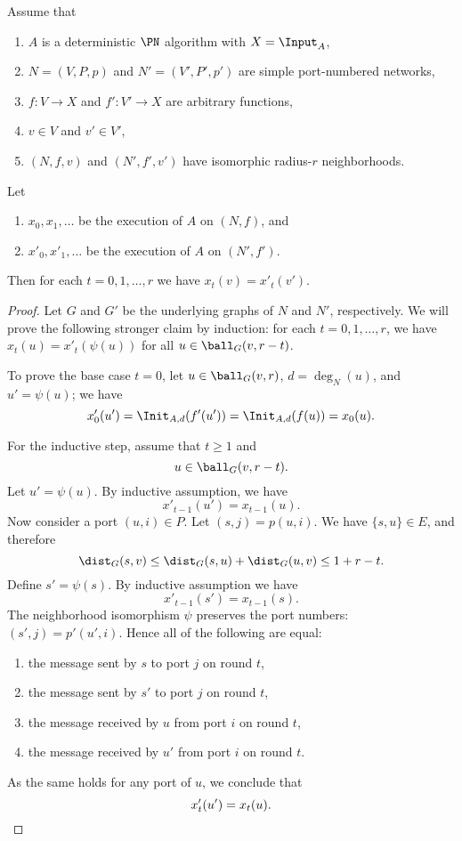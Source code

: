 \begin{theorem}\label{thm:local-neighborhood}
    Assume that
    \begin{enumerate}[itemsep=0ex]\raggedright
        \item $A$ is a deterministic $\PN$ algorithm with $X = \Input_A$,
        \item $N = (V,P,p)$ and $N' = (V'\!,P'\!,p')$ are simple port-numbered networks,
        \item $f\colon V \to X$ and $f'\colon V' \to X$ are arbitrary functions,
        \item $v \in V$ and $v' \in V'$,
        \item $(N,f,v)$ and $(N'\!,f'\!,v')$ have isomorphic radius-$r$ neighborhoods.
    \end{enumerate}
    Let
    \begin{enumerate}[resume*]
        \item $x_0, x_1, \dotsc$ be the execution of $A$ on $(N,f)$, and
        \item $x'_0, x'_1, \dotsc$ be the execution of $A$ on $(N'\!,f')$.
    \end{enumerate}
    Then for each $t = 0, 1, \dotsc, r$ we have $x_t(v) = x'_t(v')$.
\end{theorem}

\begin{proof}
    Let $G$ and $G'$ be the underlying graphs of $N$ and $N'$, respectively. We will prove the following stronger claim by induction: for each $t = 0, 1, \dotsc, r$, we have $x_t(u) = x'_t(\psi(u))$ for all $u \in \ball_G(v,r-t)$.
    
    To prove the base case $t = 0$, let $u \in \ball_G(v,r)$, $d = \deg_N(u)$, and $u' = \psi(u)$; we have
    \[
        x'_0(u') = \Init_{A,d}(f'(u')) = \Init_{A,d}(f(u)) = x_0(u).
    \]
    
    For the inductive step, assume that $t \ge 1$ and \[u \in \ball_G(v,r-t).\] Let $u' = \psi(u)$. By inductive assumption, we have
    \[
        x'_{t-1}(u') = x_{t-1}(u).
    \]
    Now consider a port $(u,i) \in P$. Let $(s,j) = p(u,i)$. We have $\{s,u\} \in E$, and therefore
    \[
        \dist_G(s,v) \le \dist_G(s,u) + \dist_G(u,v) \le 1 + r-t.
    \]
    Define $s' = \psi(s)$. By inductive assumption we have
    \[
        x'_{t-1}(s') = x_{t-1}(s).
    \]
    The neighborhood isomorphism $\psi$ preserves the port numbers: $(s',j) = p'(u',i)$. Hence all of the following are equal:
    \begin{enumerate}[noitemsep]
        \item the message sent by $s$ to port $j$ on round $t$,
        \item the message sent by $s'$ to port $j$ on round $t$,
        \item the message received by $u$ from port $i$ on round $t$,
        \item the message received by $u'$ from port $i$ on round $t$.
    \end{enumerate}
    As the same holds for any port of $u$, we conclude that
    \[
        x'_t(u') = x_t(u). \qedhere
    \]
\end{proof}

